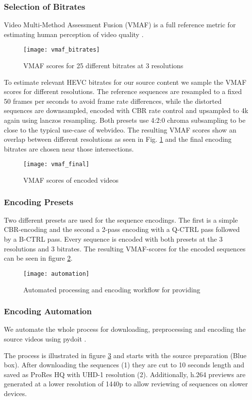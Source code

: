 \subsubsection{Selection of Bitrates}
Video Multi-Method Assessment Fusion (VMAF) is a full reference metric for estimating human perception of video quality \cite{lin2014:fvqa}.

\begin{figure}[!t]
	\centering
	\texttt{[image: vmaf\_bitrates]}
	\caption{VMAF scores for 25 different bitrates at 3 resolutions}
	\label{fig:vmaf:bitrates}
\end{figure}

To estimate relevant HEVC bitrates for our source content we sample the VMAF scores for different resolutions. The reference sequences are resampled to a fixed 50 frames per seconds to avoid frame rate differences, while the distorted sequences are downsampled, encoded with CBR rate control and upsampled to 4k again using lanczos resampling. Both presets use 4:2:0 chroma subsampling to be close to the typical use-case of webvideo. The resulting VMAF scores show an overlap between different resolutions as seen in Fig. \ref{fig:vmaf:bitrates} and the final encoding bitrates are chosen near those intersections.

\begin{figure}[!t]
	\centering
	\texttt{[image: vmaf\_final]}
	\caption{VMAF scores of encoded videos}
	\label{fig:vmaf:encoded}
\end{figure}

\subsubsection{Encoding Presets}
Two different presets are used for the sequence encodings. The first is a simple CBR-encoding and the second a 2-pass encoding with a Q-CTRL pass followed by a B-CTRL pass. Every sequence is encoded with both presets at the 3 resolutions and 3 bitrates. The resulting VMAF-scores for the encoded sequences can be seen in figure \ref{fig:vmaf:encoded}.

\begin{figure}[!t]
	\centering
	\texttt{[image: automation]}
	\caption{Automated processing and encoding workflow for providing }
	\label{fig:automation}
\end{figure}

\subsubsection{Encoding Automation}
We automate the whole process for downloading, preprocessing and encoding the source videos using pydoit \cite{web:pydoit}.

The process is illustrated in figure \ref{fig:automation} and starts with the source preparation (Blue box). After downloading the sequences (1) they are cut to 10 seconds length and saved as ProRes HQ with UHD-1 resolution (2). Additionally, h.264 previews are generated at a lower resolution of 1440p to allow reviewing of sequences on slower devices.



